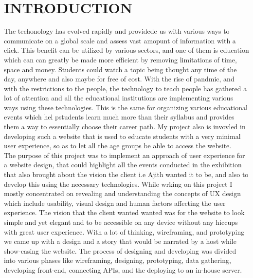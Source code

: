 \chapter{INTRODUCTION} %
\label{ChapterIntroduction} %



The techonology has evolved rapidly and providede us with various ways to communicate on a global scale and assess vast amopunt of information with a click. This benefit can be utilized by various sectors, and one of them is education which can can greatly be made more efficient by removing limitations of time, space and money. Students could watch a topic being thought any time of the day, anywhere and also maybe for free of cost. With the rise of pandmic, and with the restrictions to the people, the technology to teach people has gathered a lot of attention and all the educational institutions are implementing various ways using these technologies. This is the same for organizing various educational events which hel pstudents learn much more than their syllabus and provides them a way to essentially choose their career path. My project also is invovled in developing such a website that is used to educate students with a very minimal user experience, so as to let all the age groups be able to access the website.
\\
The purpose of this project was to implement an approach of user experience for a website design, that could highlight all the events conducted in the exhibition that also brought about the vision the client i.e Ajith wanted it to be, and also to develop this using the necessary technologies. While wrking on this project I mostly 
concentrated on revealing and understanding the concepts of UX design which include usability, visual design and human factors affecting the user experience.
The vision that the client wanted wanted was for the website to look simple and yet elegant and to be accessible on any device without any hiccups with great user experience. With a lot of thinking, wireframing, and prototyping we came up with a design and a story that would be narrated by a host while show-casing the website.
The process of designing and developing was divided into various phases like wireframing, designing, prototyping, data gathering, developing front-end, connecting APIs, and the deploying to an in-house server.   


